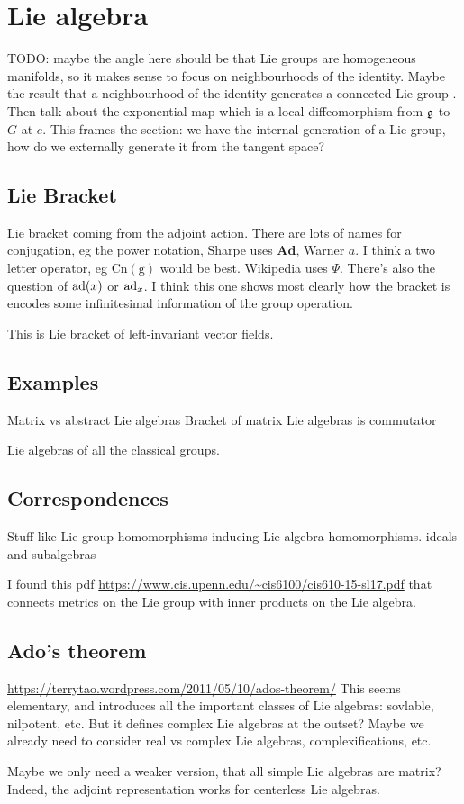 \chapter{Lie algebra}

TODO: maybe the angle here should be that Lie groups are homogeneous manifolds, so it makes sense to focus on neighbourhoods of the identity.
Maybe the result that a neighbourhood of the identity generates a connected Lie group \cite[3.18]{Warner1983}.
Then talk about the exponential map which is a local diffeomorphism from $\mathfrak{g}$ to $G$ at $e$.
This frames the section: we have the internal generation of a Lie group, how do we externally generate it from the tangent space?

\section{Lie Bracket}
Lie bracket coming from the adjoint action.
There are lots of names for conjugation, eg the power notation, Sharpe uses $\mathbf{Ad}$, Warner $a$. I think a two letter operator, eg $\operatorname{Cn(g)}$ would be best. Wikipedia uses $\Psi$. There's also the question of $\operatorname{ad}(x)$ or $\operatorname{ad}_x$.
I think this one shows most clearly how the bracket is encodes some infinitesimal information of the group operation.

This is Lie bracket of left-invariant vector fields.


\section{Examples}
Matrix vs abstract Lie algebras
Bracket of matrix Lie algebras is commutator

Lie algebras of all the classical groups.


\section{Correspondences}

Stuff like Lie group homomorphisms inducing Lie algebra homomorphisms.
ideals and subalgebras

I found this pdf \url{https://www.cis.upenn.edu/~cis6100/cis610-15-sl17.pdf} that connects metrics on the Lie group with inner products on the Lie algebra.


\section{Ado's theorem}
\url{https://terrytao.wordpress.com/2011/05/10/ados-theorem/}
This seems elementary, and introduces all the important classes of Lie algebras: sovlable, nilpotent, etc. But it defines complex Lie algebras at the outset? Maybe we already need to consider real vs complex Lie algebras, complexifications, etc.

Maybe we only need a weaker version, that all simple Lie algebras are matrix?
Indeed, the adjoint representation works for centerless Lie algebras.
